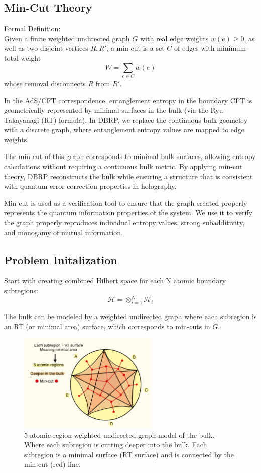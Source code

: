 \documentclass[12pt]{article}
\begin{document}
\subsection{Min-Cut Theory}
Formal Definition:
\\
Given a finite weighted undirected graph \( G \) with real edge weights \( w(e) \geq 0 \), as well as two disjoint vertices \( R, R' \), a min-cut is a set \( C \) of edges with minimum total weight
    \[
    W = \sum_{e \in C} w(e)
    \]
whose removal disconnects \( R \) from \( R' \).

In the AdS/CFT correspondence, entanglement entropy in the boundary CFT is geometrically represented by minimal surfaces in the bulk (via the Ryu-Takayanagi (RT) formula). In DBRP, we replace the continuous bulk geometry with a discrete graph, where entanglement entropy values are mapped to edge weights.

The min-cut of this graph corresponds to minimal bulk surfaces, allowing entropy calculations without requiring a continuous bulk metric. By applying min-cut theory, DBRP reconstructs the bulk while ensuring a structure that is consistent with quantum error correction properties in holography.

Min-cut is used as a verification tool to ensure that the graph created properly represents the quantum information properties of the system.
We use it to verify the graph properly reproduces individual entropy values, strong subadditivity, and monogamy of mutual information.

\subsection{Problem Initalization}
Start with creating combined Hilbert space for each N atomic boundary subregions:
\[
\mathcal{H} = \otimes^{N}_{i=1}\mathcal{H}_{i}
\]

The bulk can be modeled by a weighted undirected graph where each subregion is an RT (or minimal area) surface, which corresponds to min-cuts in \( G \).

\begin{figure}[htbp]  %
    \centering
    \includegraphics[width=0.6\textwidth, height=0.23\textheight]{mincut_graph.jpeg}  %
    \caption{5 atomic region weighted undirected graph model of the bulk. Where each subregion is cutting deeper into the bulk. Each subregion is a minimal surface (RT surface) and is connected by the min-cut (red) line.}  %
    \label{fig:mincut}  %
\end{figure}
\end{document}
